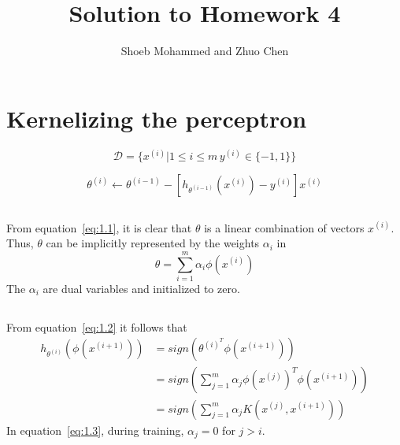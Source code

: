 \documentclass{article}
\begin{document}
\title{Solution to Homework 4}
\author{Shoeb Mohammed and Zhuo Chen}
\maketitle

\newcommand{\QEDA}{\hfill\ensuremath{\blacksquare}}
\newcommand{\QEDB}{\hfill\ensuremath{\square}}

\section{Kernelizing the perceptron}
\begin{equation*}
	\mathcal{D} = \{x^{(i)} | 1 \leq i \leq m\, y^{(i)} \in \{-1,1\}\} 
\end{equation*}

\begin{equation}
	\label{eq:1.1}
    \theta^{(i)} \leftarrow \theta^{(i-1)} - [h_{\theta^{(i-1)}}(x^{(i)}) - y^{(i)}]x^{(i)}
\end{equation}

\subsection{}
From equation~\ref{eq:1.1}, it is clear that $\theta$ is a linear combination of vectors $x^{(i)}$.
Thus, $\theta$ can be implicitly represented by the weights $\alpha_i$ in
\begin{equation}
	\label{eq:1.2}
    \theta = \sum_{i=1}^{m} \alpha_i \phi(x^{(i)})
\end{equation}
The $\alpha_i$ are dual variables and initialized to zero.

\subsection{}
From equation~\ref{eq:1.2} it follows that
\begin{equation}
  \label{eq:1.3}
  \begin{split}
  h_{\theta^{(i)}}(\phi(x^{(i+1)})) &= sign\left(\theta^{(i)^T}\phi(x^{(i+1)})\right) \\
                  &= sign\left(\sum_{j=1}^{m} \alpha_j \phi(x^{(j)})^T \phi(x^{(i+1)})\right) \\
				  &= sign\left(\sum_{j=1}^{m} \alpha_j K( x^{(j)}, x^{(i+1)} )\right)
  \end{split}
\end{equation}
In equation~\ref{eq:1.3}, during training, $\alpha_j = 0$ for $j > i$.
\end{document}
